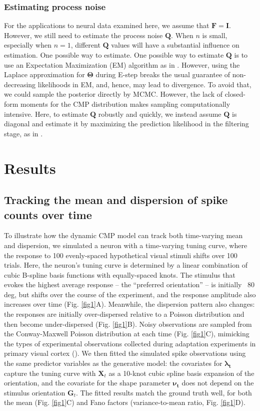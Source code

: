 \documentclass[aoas]{imsart}
\theoremstyle{plain}
\theoremstyle{remark}
\begin{document}
\subsubsection{Estimating process noise}
\label{estQ}
For the applications to neural data examined here, we assume that $\bm{F}=\bm{I}$. However, we still need to estimate the process noise $\bm{Q}$. When $n$ is small, especially when $n=1$, different $\bm{Q}$ values will have a substantial influence on estimation. One possible way to estimate. One possible way to estimate $\bm{Q}$ is to use an Expectation Maximization (EM) algorithm as in \cite{Macke2011}. However, using the Laplace approximation for $\bm{\Theta}$ during E-step breaks the usual guarantee of non-decreasing likelihoods in EM, and, hence, may lead to divergence. To avoid that, we could sample the posterior directly by MCMC. However, the lack of closed-form moments for the CMP distribution makes sampling computationally intensive. Here, to estimate $\bm{Q}$ robustly and quickly, we instead assume $\bm{Q}$ is diagonal and estimate it by maximizing the prediction likelihood in the filtering stage, as in \cite{Wei2021}. 

\section{Results}

\subsection{Tracking the mean and dispersion of spike counts over time}
To illustrate how the dynamic CMP model can track both time-varying mean and dispersion, we simulated a neuron with a time-varying tuning curve, where the response to 100 evenly-spaced hypothetical visual stimuli shifts over 100 trials. Here, the neuron’s tuning curve is determined by a linear combination of cubic B-spline basis functions with equally-spaced knots. The stimulus that evokes the highest average response – the “preferred orientation” – is initially ~80 deg, but shifts over the course of the experiment, and the response amplitude also increases over time (Fig. \ref{fig1}A). Meanwhile, the dispersion pattern also changes: the responses are initially over-dispersed relative to a Poisson distribution and then become under-dispersed (Fig. \ref{fig1}B). Noisy observations are sampled from the Conway-Maxwell Poisson distribution at each time (Fig. \ref{fig1}C), mimicking the types of experimental observations collected during adaptation experiments in primary visual cortex (\cite{Dragoi2000}). We then fitted the simulated spike observations using the same predictor variables as the generative model: the covariates for $\bm{\lambda_t}$ capture the tuning curve with $\bm{X}_t$ as a 10-knot cubic spline basis expansion of the orientation, and the covariate for the shape parameter $\bm{\nu_t}$ does not depend on the stimulus orientation $\bm{G}_t$. The fitted results match the ground truth well, for both the mean (Fig. \ref{fig1}C) and Fano factors (variance-to-mean ratio, Fig. \ref{fig1}D).
\end{document}
